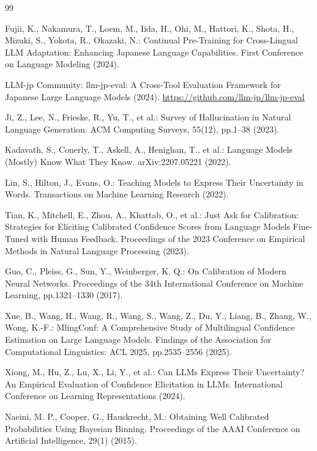 \begin{thebibliography}{99}
{\normalsize

 Fujii, K., Nakamura, T., Loem, M., Iida, H., Ohi, M., Hattori, K., Shota, H., Mizuki, S., Yokota, R., Okazaki, N.: Continual Pre-Training for Cross-Lingual LLM Adaptation: Enhancing Japanese Language Capabilities. First Conference on Language Modeling (2024).

 LLM-jp Community: llm-jp-eval: A Cross-Tool Evaluation Framework for Japanese Large Language Models (2024). \url{https://github.com/llm-jp/llm-jp-eval}

 Ji, Z., Lee, N., Frieske, R., Yu, T., et al.: Survey of Hallucination in Natural Language Generation. ACM Computing Surveys, 55(12), pp.1--38 (2023).

 Kadavath, S., Conerly, T., Askell, A., Henighan, T., et al.: Language Models (Mostly) Know What They Know. arXiv:2207.05221 (2022).

 Lin, S., Hilton, J., Evans, O.: Teaching Models to Express Their Uncertainty in Words. Transactions on Machine Learning Research (2022).

 Tian, K., Mitchell, E., Zhou, A., Khattab, O., et al.: Just Ask for Calibration: Strategies for Eliciting Calibrated Confidence Scores from Language Models Fine-Tuned with Human Feedback. Proceedings of the 2023 Conference on Empirical Methods in Natural Language Processing (2023).

 Guo, C., Pleiss, G., Sun, Y., Weinberger, K. Q.: On Calibration of Modern Neural Networks. Proceedings of the 34th International Conference on Machine Learning, pp.1321--1330 (2017).

 Xue, B., Wang, H., Wang, R., Wang, S., Wang, Z., Du, Y., Liang, B., Zhang, W., Wong, K.-F.: MlingConf: A Comprehensive Study of Multilingual Confidence Estimation on Large Language Models. Findings of the Association for Computational Linguistics: ACL 2025, pp.2535--2556 (2025).

 Xiong, M., Hu, Z., Lu, X., Li, Y., et al.: Can LLMs Express Their Uncertainty? An Empirical Evaluation of Confidence Elicitation in LLMs. International Conference on Learning Representations (2024).

 Naeini, M. P., Cooper, G., Hauskrecht, M.: Obtaining Well Calibrated Probabilities Using Bayesian Binning. Proceedings of the AAAI Conference on Artificial Intelligence, 29(1) (2015).

}
\end{thebibliography}
